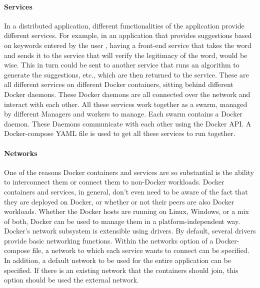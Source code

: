 		\paragraph{Services}
		In a distributed application, different functionalities of the application provide different services. For example, in an application that provides suggestions based on keywords entered by the user , having a front-end service that takes the word and sends it to the service that will verify the legitimacy of the word, would be wise. This in turn could be sent to another service that runs an algorithm to generate the suggestions, etc., which are then returned to the service. These are all different services on different Docker containers, sitting behind different Docker daemons. These Docker daemons are all connected over the network and interact with each other.
		All these services work together as a swarm, managed by different Managers and workers to manage. Each swarm contains a Docker daemon. These Daemons communicate with each other using the Docker API. A Docker-compose YAML file is used to get all these services to run together.\cite[P.~35]{Kinnary2018}

		\paragraph{Networks}
		One of the reasons Docker containers and services are so substantial is the ability to interconnect them or connect them to non-Docker workloads. Docker containers and services, in general, don't even need to be aware of the fact that they are deployed on Docker, or whether or not their peers are also Docker workloads. Whether the Docker hosts are running on Linux, Windows, or a mix of both, Docker can be used to manage them in a platform-independent way. Docker's network subsystem is extensible using drivers. By default, several drivers provide basic networking functions.\cite{dockerNetwork} 
		Within the networks option of a Docker-compose file,  a network to which each service wants to connect can be specified. In addition, a default network to be used for the entire application can be specified. If there is an existing network that the containers should join, this option should be used the external network.\cite{Kinnary2018}
		
